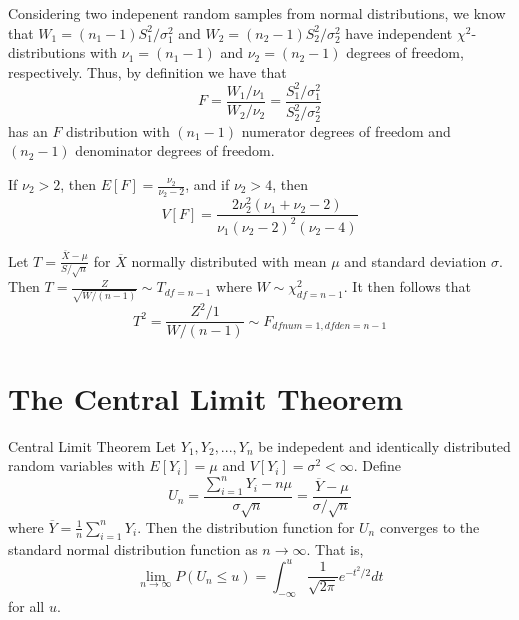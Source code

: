 \documentclass[12pt, a4paper, twoside, openright, titlepage]{book}
\begin{document}
Considering two indepenent random samples from normal distributions, we know that $W_1 = (n_1-1)S_1^2/\sigma_1^2$ and $W_2 = (n_2 - 1)S_2^2/\sigma_2^2$ have independent $\chi^2$-distributions with $\nu_1 = (n_1-1)$ and $\nu_2 = (n_2-1)$ degrees of freedom, respectively. Thus, by definition we have that \begin{equation*}
    F = \frac{W_1/\nu_1}{W_2/\nu_2} = \frac{S_1^2/\sigma_1^2}{S_2^2/\sigma_2^2}
\end{equation*}
has an $F$ distribution with $(n_1-1)$ numerator degrees of freedom and $(n_2-1)$ denominator degrees of freedom.


\begin{rmk}{}{}
    If $\nu_2 > 2$, then $E[F] = \frac{\nu_2}{\nu_2-2}$, and if $\nu_2 > 4$, then \begin{equation*}
        V[F] = \frac{2\nu_2^2(\nu_1+\nu_2-2)}{\nu_1(\nu_2-2)^2(\nu_2-4)}
    \end{equation*}
\end{rmk}

\begin{cor}{}{}
    Let $T = \frac{\overline{X} - \mu}{S/\sqrt{n}}$ for $\overline{X}$ normally distributed with mean $\mu$ and standard deviation $\sigma$. Then $T = \frac{Z}{\sqrt{W/(n-1)}} \sim T_{df = n-1}$ where $W \sim \chi^2_{df = n-1}$. It then follows that \begin{equation*}
        T^2 = \frac{Z^2/1}{W/(n-1)} \sim F_{dfnum = 1, dfden = n-1}
    \end{equation*}
\end{cor}




\section{\textsection The Central Limit Theorem}

\begin{namthm}{Central Limit Theorem}{}
    Let $Y_1,Y_2,...,Y_n$ be indepedent and identically distributed random variables with $E[Y_i] = \mu$ and $V[Y_i] = \sigma^2 < \infty$. Define \begin{equation*}
        U_n = \frac{\sum_{i=1}^nY_i - n\mu}{\sigma\sqrt{n}} = \frac{\overline{Y}-\mu}{\sigma/\sqrt{n}}
    \end{equation*}
    where $\overline{Y} = \frac{1}{n}\sum_{i=1}^nY_i$. Then the distribution function for $U_n$ converges to the standard normal distribution function as $n\rightarrow \infty$. That is, \begin{equation*}
        \lim\limits_{n\rightarrow \infty}P(U_n \leq u) = \int_{-\infty}^u\frac{1}{\sqrt{2\pi}}e^{-t^2/2}dt
    \end{equation*}
    for all $u$.
\end{namthm}
\end{document}
